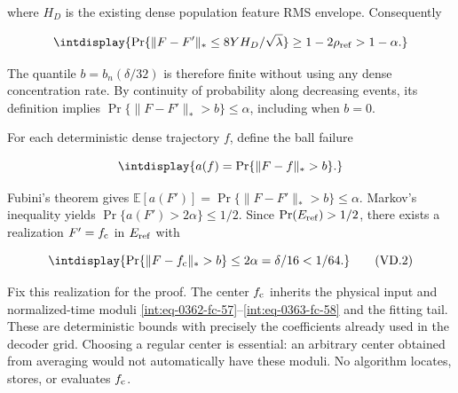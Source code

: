 
where \(H_D\) is the existing dense population feature RMS envelope. Consequently


\begingroup\renewcommand{\theHequation}{intdisplay.804}
\begin{equation*}
\intdisplay{
\Pr\{\|F-F'\|_*\le8YH_D/\sqrt\lambda\}
 \ge1-2\rho_{\rm ref}>1-\alpha.
}
\end{equation*}
\endgroup


The quantile \(b=b_n(\delta/32)\) is therefore finite without using any dense concentration rate. By continuity of probability along decreasing events, its definition implies \(\Pr\{\|F-F'\|_*>b\}\le\alpha\), including when \(b=0\).



For each deterministic dense trajectory \(f\), define the ball failure


\begingroup\renewcommand{\theHequation}{intdisplay.805}
\begin{equation*}
\intdisplay{
a(f)=\Pr\{\|F-f\|_*>b\}.
}
\end{equation*}
\endgroup


Fubini's theorem gives \(\mathbb E[a(F')] =\Pr\{\|F-F'\|_*>b\}\le\alpha\). Markov's inequality yields \(\Pr\{a(F')>2\alpha\}\le1/2\). Since \(\Pr(E_{\rm ref})>1/2\), there exists a realization \(F'=f_{\rm c}\) in \(E_{\rm ref}\) with


\begingroup\renewcommand{\theHequation}{intdisplay.806}
\begin{equation}
\intdisplay{
\Pr\{\|F-f_{\rm c}\|_*>b\}\le2\alpha=\delta/16<1/64.
}
\tag{VD.2}
\label{int:eq-0391-vd-2}
\end{equation}
\endgroup


Fix this realization for the proof. The center \(f_{\rm c}\) inherits the physical input and normalized-time moduli \eqref{int:eq-0362-fc-57}--\allowbreak \eqref{int:eq-0363-fc-58} and the fitting tail. These are deterministic bounds with precisely the coefficients already used in the decoder grid. Choosing a regular center is essential: an arbitrary center obtained from averaging would not automatically have these moduli. No algorithm locates, stores, or evaluates \(f_{\rm c}\).


